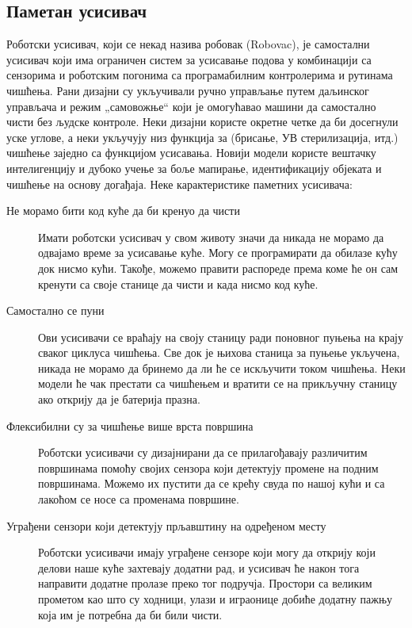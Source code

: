 \documentclass[a4paper]{article}
\begin{document}
\subsection{Паметан усисивач}
Роботски усисивач, који се некад назива робовак (Robovac), је самостални усисивач који има ограничен систем за усисавање подова у комбинацији са сензорима
и роботским погонима са програмабилним контролерима и рутинама чишћења. Рани дизајни су укључивали ручно управљање путем даљинског управљача и режим
„самовожње“ који је омогућавао машини да самостално чисти без људске контроле. Неки дизајни користе окретне четке да би досегнули уске углове,
а неки укључују низ функција за (брисање, УВ стерилизација, итд.) чишћење заједно са функцијом усисавања. Новији модели користе вештачку интелигенцију
и дубоко учење за боље мапирање, идентификацију објеката и чишћење на основу догађаја.
\newline\newline Неке карактеристике паметних усисивача:
\begin{description}
    \item[Не морамо бити код куће да би кренуо да чисти]
    Имати роботски усисивач у свом животу значи да никада не морамо да одвајамо време за усисавање куће.
    Могу се програмирати да обилазе кућу док нисмо кући. Такође, можемо правити распореде према коме ће он сам кренути са своје станице да чисти
    и када нисмо код куће.
    \item[Самостално се пуни]
    Ови усисивачи се враћају на своју станицу ради поновног пуњења на крају сваког циклуса чишћења. Све док је њихова станица за пуњење укључена,
    никада не морамо да бринемо да ли ће се искључити током чишћења. Неки модели ће чак престати са чишћењем и вратити се на прикључну станицу
    ако открију да је батерија празна.
    \item[Флексибилни су за чишћење више врста површина]
    Роботски усисивачи су дизајнирани да се прилагођавају различитим површинама помоћу својих сензора који детектују промене на подним површинама.
    Можемо их пустити да се крећу свуда по нашој кући и са лакоћом се носе са променама површине.
    \item[Уграђени сензори који детектују прљавштину на одређеном месту]
    Роботски усисивачи имају уграђене сензоре који могу да открију који делови наше куће захтевају додатни рад, и усисивач ће након тога направити додатне
    пролазе преко тог подручја. Простори са великим прометом као што су ходници, улази и играонице добиће додатну пажњу која им је потребна да би били чисти.
\end{description}
\end{document}
